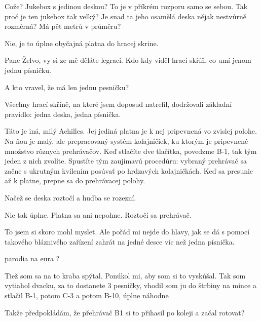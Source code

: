 \documentclass[12pt]{article}
\begin{document}
\begin{description}[itemsep=0pt]
\item[A:] Cože? Jukebox s jedinou deskou? To je v příkrém rozporu samo se sebou.
    Tak proč je ten jukebox tak velký? Je snad ta jeho osamělá deska nějak
    nestvůrně rozměrná? Má pět metrů v průměru?

\item[Ž:] Nie, je to úplne obyčajná platna do hracej skrine.

\item[A:] Pane Želvo, vy si ze mě děláte legraci. Kdo kdy viděl hrací
    skříň, co umí jenom jednu písničku.

\item[Ž:] A kto vravel, že má len jednu pesničku?

\item[A:] Všechny hrací skříně, na které jsem doposud natrefil, dodržovali základní
    pravidlo: jedna deska, jedna písnička.

\item[Ž:] Táto je iná, milý Achilles. Jej jediná platna je k nej pripevnená vo 
    zvislej polohe. Na ňou je malý, ale prepracovaný systém koľajničiek, ku ktorým 
    je pripevnené množstvo rôznych prehrávačov. Keď stlačíte dve tlačítka, povedzme 
    B-1, tak tým jeden z nich zvolíte. Spustíte tým zaujímavú procedúru: vybraný 
    prehrávač sa začne s ukrutným kvílením posúvať po hrdzavých kolajničkách. Keď 
    sa presunie až k platne, prepne sa do prehrávacej polohy.

\item[A:] Načež se deska roztočí a hudba se rozezní.

\item[Ž:] Nie tak úplne. Platna sa ani nepohne. Roztočí sa prehrávač.

\item[A:] To jsem si skoro mohl myslet. Ale pořád mi nejde do hlavy, jak
    se dá s pomocí takového bláznivého zařízení zahrát na jedné desce víc než
    jedna písnička.

\item[TODO] parodia na eura ?

\item[Ž:] Tiež som sa na to kraba spýtal. Ponúkol mi, aby som si to vyskúšal. 
    Tak som vytiahol dvacku, za to dostanete 3 pesničky, vhodil som ju do štrbiny 
    na mince a stlačil B-1, potom C-3 a potom B-10, úplne náhodne

\item[A:] Takže předpokládám, že přehrávač B1 si to přihasil po koleji
    a začal rotovat?


\end{description}
\end{document}
